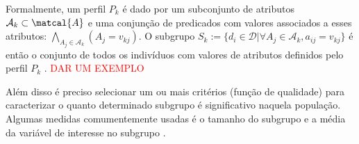 \documentclass{article}
\begin{document}
Formalmente, um perfil $P_k$ é dado por um subconjunto de atributos $\mathcal{A}_k \subset \matcal{A}$ e uma conjunção de predicados com valores associados a esses atributos: $\bigwedge\limits_{A_j \in \mathcal{A}_k} (A_j = v_{kj})$. O subgrupo $S_{k}:=\{d_i \in \mathcal{D} | \forall A_j \in \mathcal{A}_k,  a_{ij} = v_{kj}\}$ é então o conjunto de todos os indivíduos com valores de atributos definidos pelo perfil $P_k$ \cite{park2019finding}. \textcolor{red}{DAR UM EXEMPLO}


Além disso é preciso selecionar um ou mais critérios (função de qualidade) para caracterizar o quanto determinado subgrupo é significativo naquela população. Algumas medidas comumentemente usadas é o tamanho do subgrupo e a média da variável de interesse no subgrupo \cite{park2019finding}.


\newpage


\end{document}
